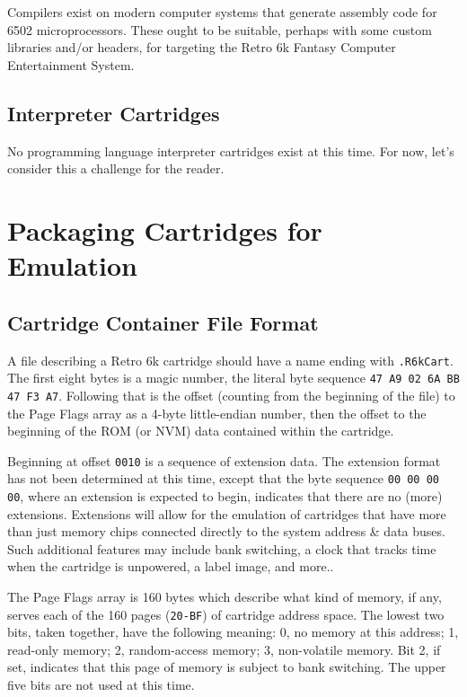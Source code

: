 \documentclass[12pt]{{memoir}}
\begin{document}
Compilers exist on modern computer systems that generate assembly code for 6502 microprocessors. These ought to be suitable, perhaps with some custom libraries and/or headers, for targeting the Retro 6k Fantasy Computer Entertainment System.

\section{Interpreter Cartridges}

No programming language interpreter cartridges exist at this time. For now, let's consider this a challenge for the reader.

\chapter{Packaging Cartridges for Emulation}
\section{Cartridge Container File Format}

A file describing a Retro 6k cartridge should have a name ending with \texttt{.R6kCart}. The first eight bytes is a magic number, the literal byte sequence \texttt{47 A9 02 6A BB 47 F3 A7}. Following that is the offset (counting from the beginning of the file) to the Page Flags array as a 4-byte little-endian number, then the offset to the beginning of the ROM (or NVM) data contained within the cartridge.

Beginning at offset \texttt{0010} is a sequence of extension data. The extension format has not been determined at this time, except that the byte sequence \texttt{00 00 00 00}, where an extension is expected to begin, indicates that there are no (more) extensions. Extensions will allow for the emulation of cartridges that have more than just memory chips connected directly to the system address \& data buses. Such additional features may include bank switching, a clock that tracks time when the cartridge is unpowered, a label image, and more..

The Page Flags array is 160 bytes which describe what kind of memory, if any, serves each of the 160 pages (\texttt{20-BF}) of cartridge address space. The lowest two bits, taken together, have the following meaning: 0, no memory at this address; 1, read-only memory; 2, random-access memory; 3, non-volatile memory. Bit 2, if set, indicates that this page of memory is subject to bank switching. The upper five bits are not used at this time.
\end{document}
